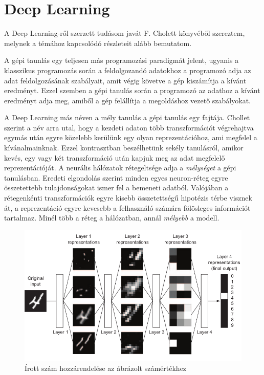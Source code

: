 \section{Deep Learning}
A Deep Learning-ről szerzett tudásom javát F. Cholett könyvéből\cite{Chollet} szereztem, melynek a témához kapcsolódó részleteit alább bemutatom.

A gépi taunlás egy teljesen más programozási paradigmát jelent, ugyanis a klasszikus programozás során a feldolgozandó adatokhoz a programozó adja az adat feldolgozásának szabályait, amit végig követve a gép kiszámítja a kívánt eredményt. Ezzel szemben a gépi tanulás során a programozó az adathoz  a kívánt eredményt adja meg, amiből a gép felállítja a megoldáshoz vezető szabályokat.%

A Deep Learning más néven a mély tanulás a gépi tanulás egy fajtája. Chollet szerint a név arra utal, hogy a kezdeti adaton több transzformációt végrehajtva egymás után egyre közelebb kerülünk egy olyan reprezentációhoz, ami megfelel a kívánalmainknak. Ezzel kontrasztban beszélhetünk sekély tanulásról, amikor kevés, egy vagy két transzformáció után kapjuk meg az adat megfelelő reprezentációját.%
A neurális hálózatok rétegeltsége adja a \emph{mélységet} a gépi tanulásban. Eredeti elgondolás szerint minden egyes neuron-réteg egyre összetettebb tulajdonságokat ismer fel a bemeneti adatból. Valójában a rétegenkénti transzformációk egyre kisebb összetettségű hipotézis térbe visznek át, a reprezentáció egyre kevesebb a felhasználó számára fölösleges információt tartalmaz. Minél több a réteg a hálózatban, annál \emph{mélyebb} a modell.

\begin{figure}[h]
	\centering
	\includegraphics[width=0.8\columnwidth]{fig/digit_classification.png}
	\caption{Írott szám hozzárendelése az ábrázolt számértékhez}
	\label{fig:digit_classification}
	\footnotemark
\end{figure}

